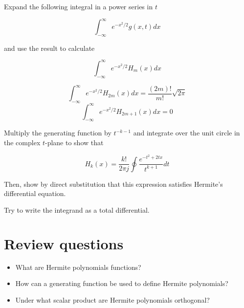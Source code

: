 \pagebreak

\begin{exer}
Expand the following integral in a power series in $t$

$$ \int_{-\infty}^{\infty} e^{-x^2/2} g(x,t) dx$$

and use the result to calculate

$$\int_{-\infty}^{\infty} e^{-x^2/2} H_{m}(x) dx $$

\begin{sol}
$$\int_{-\infty}^{\infty} e^{-x^2/2} H_{2m}(x) dx = \frac{(2m)!}{m!} \sqrt{2\pi} $$
$$\int_{-\infty}^{\infty} e^{-x^2/2} H_{2m+1}(x) dx = 0 $$
\end{sol}
\end{exer}


\begin{exer}
Multiply the generating function by $t^{-k-1}$ and integrate over the unit circle in the complex $t$-plane to show that

$$H_k(x) =\frac{k!}{2 \pi j} \oint \frac{e^{-t^2 +2tx}}{t^{k+1}}dt $$

Then, show by direct substitution that this expression satisfies Hermite's differential equation.

\begin{hnt}
Try to write the integrand as a total differential.
\end{hnt}
  
\end{exer}


\section*{Review questions}

\begin{itemize}
\item What are Hermite polynomials functions?  
\item How can a generating function be used to define Hermite polynomials?
\item Under what scalar product are Hermite polynomials orthogonal?  
\end{itemize}



